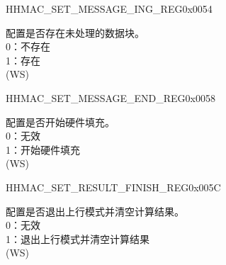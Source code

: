     \begin{register}{H}{HMAC\_SET\_MESSAGE\_ING\_REG}{0x0054}\label{regdesc:HMACSETMESSAGEINGREG}
    \regnewline%
    \begin{regdesc}\begin{reglist}
    \label{fielddesc:HMACSETTEXTING}\item [HMAC\_SET\_TEXT\_ING] 配置是否存在未处理的数据块。
    \\0：不存在
    \\1：存在 
    \\(WS)
    \end{reglist}\end{regdesc}
    \end{register}


    \begin{register}{H}{HMAC\_SET\_MESSAGE\_END\_REG}{0x0058}\label{regdesc:HMACSETMESSAGEENDREG}
    \regnewline%
    \begin{regdesc}\begin{reglist}
    \label{fielddesc:HMACSETTEXTEND}\item [HMAC\_SET\_TEXT\_END] 配置是否开始硬件填充。
    \\0：无效
    \\1：开始硬件填充 
    \\(WS)
    \end{reglist}\end{regdesc}
    \end{register}


    \begin{register}{H}{HMAC\_SET\_RESULT\_FINISH\_REG}{0x005C}\label{regdesc:HMACSETRESULTFINISHREG}
    \regnewline%
    \begin{regdesc}\begin{reglist}
    \label{fielddesc:HMACSETRESULTEND}\item [HMAC\_SET\_RESULT\_END] 配置是否退出上行模式并清空计算结果。
    \\0：无效
    \\1：退出上行模式并清空计算结果 
    \\(WS)
    \end{reglist}\end{regdesc}
    \end{register}


